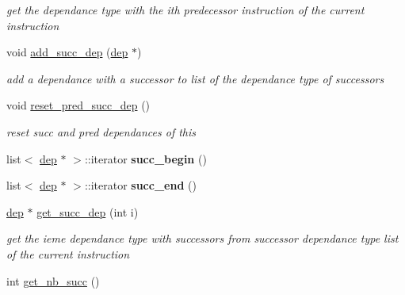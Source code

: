 \begin{DoxyCompactItemize}
\begin{DoxyCompactList}\small\item\em get the dependance type with the ith predecessor instruction of the current instruction \end{DoxyCompactList}\item 
\hypertarget{class_instruction_acefc258dbcf45c19136dc86e47a82c0e}{void \hyperlink{class_instruction_acefc258dbcf45c19136dc86e47a82c0e}{add\+\_\+succ\+\_\+dep} (\hyperlink{structdep}{dep} $\ast$)}\label{class_instruction_acefc258dbcf45c19136dc86e47a82c0e}

\begin{DoxyCompactList}\small\item\em add a dependance with a successor to list of the dependance type of successors \end{DoxyCompactList}\item 
\hypertarget{class_instruction_a786e43bcd16d16a4db7c8a665c4d68af}{void \hyperlink{class_instruction_a786e43bcd16d16a4db7c8a665c4d68af}{reset\+\_\+pred\+\_\+succ\+\_\+dep} ()}\label{class_instruction_a786e43bcd16d16a4db7c8a665c4d68af}

\begin{DoxyCompactList}\small\item\em reset succ and pred dependances of this \end{DoxyCompactList}\item 
\hypertarget{class_instruction_a2c6f13ddda889e4e2b8b69897de6b733}{list$<$ \hyperlink{structdep}{dep} $\ast$ $>$\+::iterator {\bfseries succ\+\_\+begin} ()}\label{class_instruction_a2c6f13ddda889e4e2b8b69897de6b733}

\item 
\hypertarget{class_instruction_a0800ca0afbbc783b57170d981d406fb6}{list$<$ \hyperlink{structdep}{dep} $\ast$ $>$\+::iterator {\bfseries succ\+\_\+end} ()}\label{class_instruction_a0800ca0afbbc783b57170d981d406fb6}

\item 
\hypertarget{class_instruction_ad3bb47ea5f9e4b975e0191d6c96ffc30}{\hyperlink{structdep}{dep} $\ast$ \hyperlink{class_instruction_ad3bb47ea5f9e4b975e0191d6c96ffc30}{get\+\_\+succ\+\_\+dep} (int i)}\label{class_instruction_ad3bb47ea5f9e4b975e0191d6c96ffc30}

\begin{DoxyCompactList}\small\item\em get the ieme dependance type with successors from successor dependance type list of the current instruction \end{DoxyCompactList}\item 
\hypertarget{class_instruction_ab2d8c29efa78ec3c1a70f154a8c2f068}{int \hyperlink{class_instruction_ab2d8c29efa78ec3c1a70f154a8c2f068}{get\+\_\+nb\+\_\+succ} ()}\label{class_instruction_ab2d8c29efa78ec3c1a70f154a8c2f068}


\end{DoxyCompactItemize}
